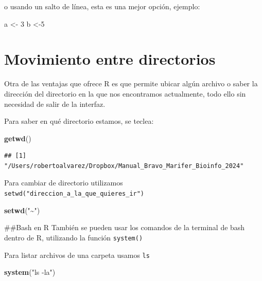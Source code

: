 \documentclass[
]{book}
\newenvironment{Shaded}{\begin{snugshade}}{\end{snugshade}}
\newcommand{\DecValTok}[1]{\textcolor[rgb]{0.00,0.00,0.81}{#1}}
\newcommand{\FunctionTok}[1]{\textcolor[rgb]{0.13,0.29,0.53}{\textbf{#1}}}
\newcommand{\NormalTok}[1]{#1}
\newcommand{\OtherTok}[1]{\textcolor[rgb]{0.56,0.35,0.01}{#1}}
\newcommand{\StringTok}[1]{\textcolor[rgb]{0.31,0.60,0.02}{#1}}
\begin{document}
o usando un salto de línea, esta es una mejor opción, ejemplo:

\begin{Shaded}
\begin{Highlighting}[]
\NormalTok{a }\OtherTok{\textless{}{-}} \DecValTok{3}
\NormalTok{b }\OtherTok{\textless{}{-}}\DecValTok{5}
\end{Highlighting}
\end{Shaded}

\hypertarget{movimiento-entre-directorios}{%
\section{Movimiento entre directorios}\label{movimiento-entre-directorios}}

Otra de las ventajas que ofrece R es que permite ubicar algún archivo o saber la dirección del directorio en la que nos encontramos actualmente, todo ello sin necesidad de salir de la interfaz.

Para saber en qué directorio estamos, se teclea:

\begin{Shaded}
\begin{Highlighting}[]
\FunctionTok{getwd}\NormalTok{()}
\end{Highlighting}
\end{Shaded}

\begin{verbatim}
## [1] "/Users/robertoalvarez/Dropbox/Manual_Bravo_Marifer_Bioinfo_2024"
\end{verbatim}

Para cambiar de directorio utilizamos \texttt{setwd("direccion\_a\_la\_que\_quieres\_ir")}

\begin{Shaded}
\begin{Highlighting}[]
\FunctionTok{setwd}\NormalTok{(}\StringTok{"\textasciitilde{}"}\NormalTok{)}
\end{Highlighting}
\end{Shaded}

\#\#Bash en R
También se pueden usar los comandos de la terminal de bash dentro de R, utilizando la función \texttt{system()}

Para listar archivos de una carpeta usamos \texttt{ls}

\begin{Shaded}
\begin{Highlighting}[]
\FunctionTok{system}\NormalTok{(}\StringTok{"ls {-}la"}\NormalTok{)}
\end{Highlighting}
\end{Shaded}
\end{document}
